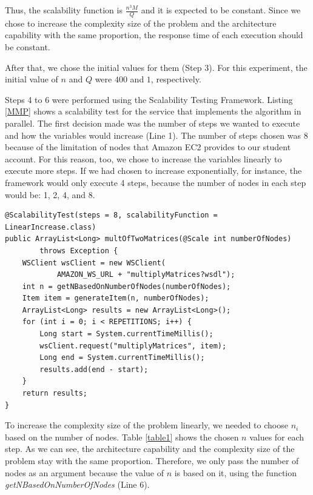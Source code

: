 Thus, the scalability function is $\frac{n^3M}{Q}$ and it is expected to be constant. Since we chose to increase the complexity size of the problem and the architecture capability with the same proportion, the response time of each execution should be constant. 

After that, we chose the initial values for them (Step 3). For this experiment, the initial value of $n$ and $Q$ were $400$ and $1$, respectively. 

Steps 4 to 6 were performed using the Scalability Testing Framework. Listing \ref{MMP} shows a scalability test for the service that implements the algorithm in parallel. The first decision made was the number of steps we wanted to execute and how the variables would increase (Line 1). The number of steps chosen was 8  because of the limitation of nodes that Amazon EC2 provides to our student account. For this reason, too, we chose to increase the variables linearly to execute more steps. If we had chosen to increase exponentially, for instance, the framework would only execute 4 steps, because the number of nodes in each step would be: 1, 2, 4, and 8.

\begin{lstlisting}
@ScalabilityTest(steps = 8, scalabilityFunction = LinearIncrease.class)
public ArrayList<Long> multOfTwoMatrices(@Scale int numberOfNodes) 
		throws Exception {
	WSClient wsClient = new WSClient(
			AMAZON_WS_URL + "multiplyMatrices?wsdl");
	int n = getNBasedOnNumberOfNodes(numberOfNodes);
	Item item = generateItem(n, numberOfNodes);
	ArrayList<Long> results = new ArrayList<Long>();
	for (int i = 0; i < REPETITIONS; i++) {
		Long start = System.currentTimeMillis();
		wsClient.request("multiplyMatrices", item);
		Long end = System.currentTimeMillis();
		results.add(end - start);			
	}
	return results;
}
\end{lstlisting}

To increase the complexity size of the problem linearly, we needed to choose $n_i$ based on the number of nodes. Table \ref{table1} shows the chosen $n$ values for each step. As we can see, the architecture capability and the complexity size of the problem stay with the same proportion. Therefore, we only pass the number of nodes as an argument because the value of $n$ is based on it, using the function \emph{getNBasedOnNumberOfNodes} (Line 6).

